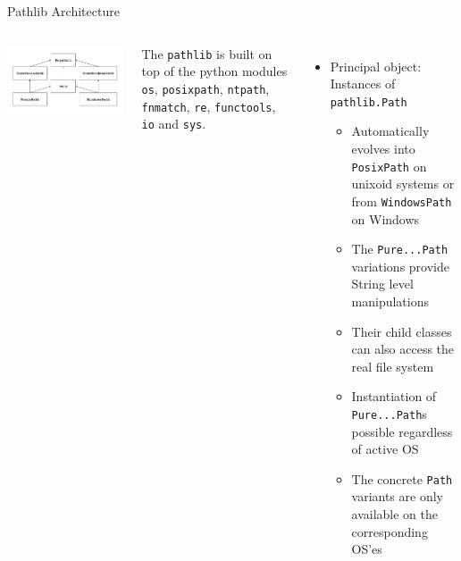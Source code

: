 \begin{frame}{Pathlib Architecture}
%
\begin{columns}
\includegraphics[width=\linewidth]{./gfx/14-pathlib-inheritance}
%
\begin{hintbox}
\scriptsize 
The \texttt{pathlib} is built on top of the python modules \texttt{os}, \texttt{posixpath}, \texttt{ntpath}, \texttt{fnmatch}, \texttt{re}, \texttt{functools}, \texttt{io} and \texttt{sys}.
\end{hintbox}
%
\begin{itemize}
\item Principal object: Instances of \texttt{pathlib.Path}
	\begin{itemize}
	\item Automatically evolves into \texttt{PosixPath} on unixoid systems or from \texttt{WindowsPath} on Windows
	\item The \texttt{Pure...Path} variations provide String level manipulations
	\item Their child classes can also access the real file system
	\item Instantiation of \texttt{Pure...Path}s possible regardless of active OS
	\item The concrete \texttt{Path} variants are only available on the corresponding OS'es
	\end{itemize}
\end{itemize}
\end{columns}
%
\end{frame}


